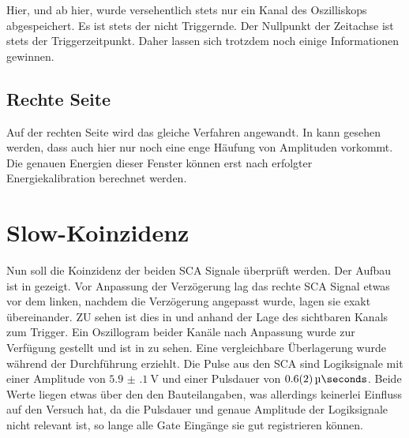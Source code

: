 Hier, und ab hier, wurde versehentlich stets nur ein Kanal des Oszilliskops abgespeichert. Es ist stets der nicht Triggernde. Der Nullpunkt der Zeitachse ist stets der Triggerzeitpunkt. Daher lassen sich trotzdem noch einige Informationen gewinnen.




\subsection*{Rechte Seite}
Auf der rechten Seite wird das gleiche Verfahren angewandt. In  kann gesehen werden, dass auch hier nur noch eine enge Häufung von Amplituden vorkommt.
Die genauen Energien dieser Fenster können erst nach erfolgter Energiekalibration berechnet werden.



\section{Slow-Koinzidenz}
Nun soll die Koinzidenz der beiden SCA Signale überprüft werden. Der Aufbau ist in  gezeigt.
Vor Anpassung der Verzögerung lag das rechte SCA Signal etwas vor dem linken, nachdem die Verzögerung angepasst wurde, lagen sie exakt übereinander. ZU sehen ist dies in  und  anhand der Lage des sichtbaren Kanals zum Trigger. Ein Oszillogram beider Kanäle nach Anpassung wurde zur Verfügung gestellt\cite{oszidata} und ist in  zu sehen. Eine vergleichbare Überlagerung wurde während der Durchführung erziehlt.
Die Pulse aus den SCA sind Logiksignale mit einer Amplitude von $\SI{5.9(1)}{\volt}$ und einer Pulsdauer von $\SI{0.6(2)}{\micro\seconds}$. Beide Werte liegen etwas über den den Bauteilangaben\cite{sca}, was allerdings keinerlei Einfluss auf den Versuch hat, da die Pulsdauer und genaue Amplitude der Logiksignale nicht relevant ist, so lange alle Gate Eingänge sie gut registrieren können.




